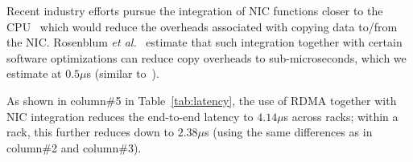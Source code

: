 Recent industry efforts pursue the integration of NIC functions closer to the CPU~\cite{cpu-nic} which would reduce the overheads associated with copying data to/from the NIC. Rosenblum {\it et al.}~\cite{lowlatency} estimate that such integration together with certain software  optimizations can reduce copy overheads to sub-microseconds, which we estimate at $0.5\mu$s (similar to~\cite{lowlatency}). 

As shown in column\#5 in Table~\ref{tab:latency}, the use of RDMA together with NIC integration reduces the end-to-end latency to $4.14\mu$s across racks; within a rack, this further reduces down to $2.38\mu$s (using the same differences as in column\#2 and column\#3).

